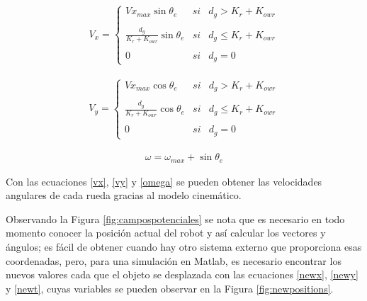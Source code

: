 \documentclass[conference]{IEEEtran}
\begin{document}
\begin{gather}\label{vy}
  V_{x}= \left\{ \begin{array}{lcc}
    Vx_{max} \sin \theta_{e} & si & d_{g} > K_{r}+K_{owr} \\
    \\ \frac{d_{g}}{K_{r}+K_{owr}} \sin \theta_{e} &  si & d_{g} \leq  K_{r}+K_{owr} \\
    \\ 0 &  si  & d_{g} = 0
  \end{array}
  \right.
\end{gather}

\begin{gather}\label{vx}
  V_{y}= \left\{ \begin{array}{lcc}
    Vx_{max} \cos \theta_{e} & si & d_{g} > K_{r}+K_{owr} \\
    \\ \frac{d_{g}}{K_{r}+K_{owr}} \cos \theta_{e} &  si & d_{g} \leq  K_{r}+K_{owr} \\
    \\ 0 &  si  & d_{g} = 0
  \end{array}
  \right.
\end{gather}

\begin{gather}\label{omega}
  \omega = \omega_{max}+\sin \theta_{e}
\end{gather}

Con las ecuaciones \ref{vx}, \ref{vy} y \ref{omega} se pueden obtener las velocidades
angulares de cada rueda gracias al modelo cinemático.

Observando la Figura \ref{fig:campospotenciales} se nota que es necesario en todo
momento conocer la posición actual del robot y así calcular los vectores y ángulos;
es fácil de obtener cuando hay otro sistema externo que proporciona esas coordenadas, pero,
para una simulación en Matlab, es necesario encontrar los nuevos valores cada que el objeto
se desplazada con las ecuaciones \ref{newx}, \ref{newy} y \ref{newt}, cuyas variables
se pueden observar en la Figura \ref{fig:newpositions}.
\end{document}
